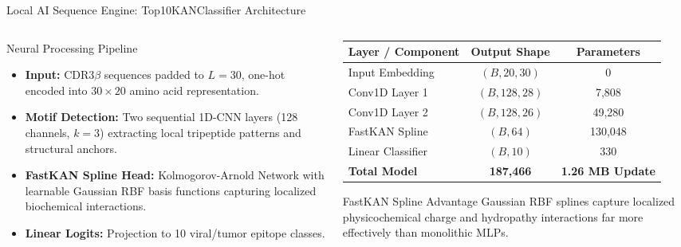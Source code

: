 \documentclass[aspectratio=169,10pt]{beamer}
\begin{document}
\begin{frame}{Local AI Sequence Engine: Top10KANClassifier Architecture}
  \begin{columns}[T]
    \begin{column}{0.52\textwidth}
      \begin{block}{Neural Processing Pipeline}
        \small
        \begin{itemize}[itemsep=3pt]
          \item \textbf{Input:} CDR3$\beta$ sequences padded to $L=30$, one-hot encoded into $30 \times 20$ amino acid representation.
          \item \textbf{Motif Detection:} Two sequential 1D-CNN layers (128 channels, $k=3$) extracting local tripeptide patterns and structural anchors.
          \item \textbf{FastKAN Spline Head:} Kolmogorov-Arnold Network with learnable Gaussian RBF basis functions capturing localized biochemical interactions.
          \item \textbf{Linear Logits:} Projection to 10 viral/tumor epitope classes.
        \end{itemize}
      \end{block}
    \end{column}
    \begin{column}{0.48\textwidth}
      \begin{table}[h]
        \centering
        \scriptsize
        \begin{tabular}{@{}lcc@{}}
          \toprule
          \textbf{Layer / Component} & \textbf{Output Shape} & \textbf{Parameters} \\
          \midrule
          Input Embedding    & $(B, 20, 30)$   & 0 \\
          Conv1D Layer 1     & $(B, 128, 28)$  & 7,808 \\
          Conv1D Layer 2     & $(B, 128, 26)$  & 49,280 \\
          FastKAN Spline     & $(B, 64)$       & 130,048 \\
          Linear Classifier  & $(B, 10)$       & 330 \\
          \midrule
          \textbf{Total Model} & \textbf{187,466} & \textbf{1.26 MB Update} \\
          \bottomrule
        \end{tabular}
      \end{table}
      \begin{exampleblock}{FastKAN Spline Advantage}
        \scriptsize
        Gaussian RBF splines capture localized physicochemical charge and hydropathy interactions far more effectively than monolithic MLPs.
      \end{exampleblock}
    \end{column}
  \end{columns}
\end{frame}
\end{document}
